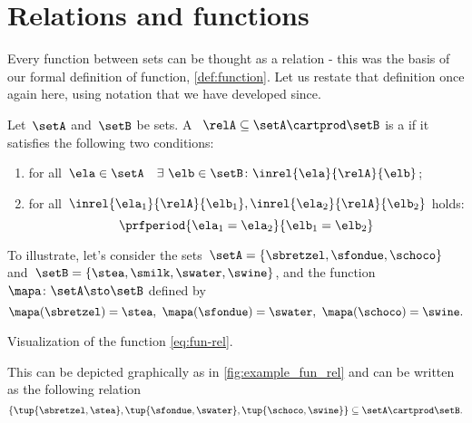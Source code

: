 
\section{Relations and functions}


Every function between sets can be thought as a relation - this was the basis of our formal definition of function, \cref{def:function}.
Let us restate that definition once again here, using notation that we have developed since. 

\begin{definition}
    \label{def:functions_as_relations}
    Let~$\setA$ and~$\setB$ be sets. A ~$\relA \subseteq \setA \cartprod \setB$ is a \emph{} if it satisfies the following two conditions:
    \begin{enumerate}
        \item for all~$\ela \in \setA \quad \exists \ \elb \in \setB\colon  \inrel{\ela}{\relA}{\elb}$;
        \item for all~$\inrel{\ela_1}{\relA}{\elb_1}, \inrel{\ela_2}{\relA}{\elb_2}$ holds:
              \begin{equation*}
                  \prfperiod{\ela_1 = \ela_2}{\elb_1 = \elb_2}
              \end{equation*}
    \end{enumerate}
\end{definition}

To illustrate, let's consider the sets~$\setA = \{ \sbretzel, \sfondue, \schoco \}$ and~$\setB = \{ \stea, \smilk, \swater, \swine \}$, and the function~$\mapa \colon \setA \sto \setB$ defined by
\begin{equation}
    \mapa (\sbretzel) = \stea, \ \mapa (\sfondue) = \swater, \ \mapa(\schoco) = \swine.
\end{equation}
\begin{marginfigure}
    \centering
    \caption{Visualization of the function \cref{eq:fun-rel}.}
    \label{fig:example_fun_rel}
\end{marginfigure}
This can be depicted graphically as in \cref{fig:example_fun_rel} and can be written as the following relation
%
\begin{equation}
    \label{eq:fun-rel}
    \{ \tup{\sbretzel, \stea}, \tup{\sfondue, \swater}, \tup{\schoco, \swine} \} \subseteq \setA \cartprod \setB.
\end{equation}


